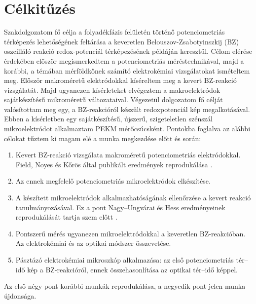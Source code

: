 \chapter{Célkitűzés} \label{celkituzes}
\pagestyle{headings}

Szakdolgozatom fő célja a folyadékfázis felületén történő potenciometriás térképezés lehetőségének feltárása a keveretlen Belouszov-Zsabotyinszkij (BZ) oszcilláló reakció redox-potenciál térképezésének példáján keresztül. Célom elérése érdekében először megismerkedtem a potenciometriás méréstechnikával, majd a korábbi, a témában mérföldkőnek számító elektrokémiai vizsgálatokat ismételtem meg. Először makroméretű elektródokkal kíséreltem meg a kevert BZ-reakció vizsgálatát. Majd ugyanezen kísérleteket elvégeztem a makroelektródok sajátkészítésű mikroméretű változataival. Végezetül dolgozatom fő célját valósítottam meg egy, a BZ-reakcióról készült redoxpotenciál kép megalkotásával. Ebben a kísérletben egy sajátkészítésű, újszerű, szigeteletlen szénszál mikroelektródot alkalmaztam PEKM mérőcsúcsként. Pontokba foglalva az alábbi célokat tűztem ki magam elé a munka megkezdése előtt és során:

\begin{enumerate}
\item Kevert BZ-reakció vizsgálata makroméretű potenciometriás elektródokkal. Field, Noyes és Kőrös által publikált eredmények reprodukálása \cite{noyes1972oscillations}. 
\item Az ennek megfelelő potenciometriás mikroelektródok elkészítése.
\item A készített mikroelektródok alkalmazhatóságának ellenőrzése a kevert reakció tanulmányozásával. Ez a pont Nagy--Ungvárai és Hess eredményeinek reprodukálását tartja szem előtt \cite{nagy1991control}. 
\item Pontszerű mérés ugyanezen mikroelektródokkal a keveretlen BZ-reakcióban. Az elektrokémiai és az optikai módszer összevetése.
\item Pásztázó elektrokémiai mikroszkóp alkalmazása: az első potenciometriás tér--idő kép a BZ-reakcióról, ennek összehasonlítása az optikai tér--idő képpel.
\end{enumerate}

Az első négy pont korábbi munkák reprodukálása, a negyedik pont jelen munka újdonsága. 

